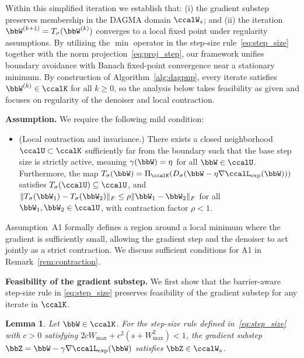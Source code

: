 \documentclass[conference]{IEEEtran}
\newtheorem{lemma}{\bf Lemma}
\newcommand{\Lext}{\ccalL_{\mathrm{exp}}}
\begin{document}
		Within this simplified iteration we establish that: (i) the gradient substep preserves membership in the DAGMA domain $\ccalW_s$; and (ii) the iteration $\bbW^{(k+1)} = T_{\sigma}(\bbW^{(k)})$ converges to a local fixed point under regularity assumptions. By utilizing the $\min$ operator in the step-size rule~\eqref{eq:step_size} together with the norm projection~\eqref{eq:proj_step}, our framework unifies boundary avoidance with Banach fixed-point convergence near a stationary minimum. By construction of Algorithm~\ref{alg:dagpnp}, every iterate satisfies $\bbW^{(k)} \in \ccalK$ for all $k \geq 0$, so the analysis below takes feasibility as given and focuses on regularity of the denoiser and local contraction.
	
	\vspace{1mm}
	\noindent\textbf{Assumption.}
	We require the following mild condition:
	\begin{itemize}
		\item[\textbf{A1.}] (Local contraction and invariance.) There exists a closed neighborhood $\ccalU \subset \ccalK$ sufficiently far from the boundary such that the base step size is strictly active, meaning $\gamma(\bbW) = \eta$ for all $\bbW \in \ccalU$. Furthermore, the map $T_\sigma(\bbW) = \Pi_{\ccalK}(D_\sigma(\bbW - \eta \nabla \Lext(\bbW)))$ satisfies $T_\sigma(\ccalU) \subseteq \ccalU$, and $\|T_\sigma(\bbW_1) - T_\sigma(\bbW_2)\|_F \leq \rho \|\bbW_1 - \bbW_2\|_F$ for all $\bbW_1, \bbW_2 \in \ccalU$, with contraction factor $\rho < 1$.
	\end{itemize}

	Assumption~A1 formally defines a region around a local minimum where the gradient is sufficiently small, allowing the gradient step and the denoiser to act jointly as a strict contraction. We discuss sufficient conditions for A1 in Remark~\ref{rem:contraction}.
	
	\vspace{1mm}
	\noindent\textbf{Feasibility of the gradient substep.}
	We first show that the barrier-aware step-size rule in \eqref{eq:step_size} preserves feasibility of the gradient substep for any iterate in $\ccalK$.
	
	\begin{lemma}\label{lem:feasibility}
		Let $\bbW \in \ccalK$. For the step-size rule defined in~\eqref{eq:step_size} with $c > 0$ satisfying $2c W_{\max} + c^2 (s + W_{\max}^2) < 1$, the gradient substep $\bbZ = \bbW - \gamma \nabla \Lext(\bbW)$ satisfies $\bbZ \in \ccalW_s$.
	\end{lemma}
	
\end{document}
